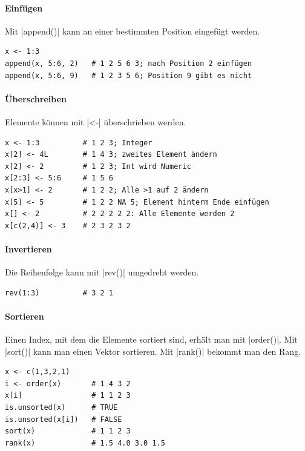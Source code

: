 \documentclass[10pt,twocolumn]{scrartcl}
\renewcommand{\lstinline}{\mycoloredinline}
\begin{document}
\paragraph{Einfügen}

Mit \lstinline|append()| kann an einer bestimmten Position eingefügt werden.

\begin{lstlisting}
x <- 1:3
append(x, 5:6, 2)   # 1 2 5 6 3; nach Position 2 einfügen
append(x, 5:6, 9)   # 1 2 3 5 6; Position 9 gibt es nicht
\end{lstlisting}

\paragraph{Überschreiben}

Elemente können mit \lstinline|<-| überschrieben werden.

\begin{lstlisting}
x <- 1:3          # 1 2 3; Integer
x[2] <- 4L        # 1 4 3; zweites Element ändern
x[2] <- 2         # 1 2 3; Int wird Numeric
x[2:3] <- 5:6     # 1 5 6
x[x>1] <- 2       # 1 2 2; Alle >1 auf 2 ändern
x[5] <- 5         # 1 2 2 NA 5; Element hinterm Ende einfügen
x[] <- 2          # 2 2 2 2 2: Alle Elemente werden 2
x[c(2,4)] <- 3    # 2 3 2 3 2
\end{lstlisting}

\paragraph{Invertieren}

Die Reihenfolge kann mit \lstinline|rev()| umgedreht werden.

\begin{lstlisting}
rev(1:3)          # 3 2 1
\end{lstlisting}

\paragraph{Sortieren}

Einen Index, mit dem die Elemente sortiert sind, erhält man mit \lstinline|order()|. Mit \lstinline|sort()| kann man einen Vektor sortieren. Mit \lstinline|rank()| bekommt man den Rang.

\begin{lstlisting}
x <- c(1,3,2,1)
i <- order(x)       # 1 4 3 2
x[i]                # 1 1 2 3
is.unsorted(x)      # TRUE
is.unsorted(x[i])   # FALSE
sort(x)             # 1 1 2 3
rank(x)             # 1.5 4.0 3.0 1.5
\end{lstlisting}
\end{document}
